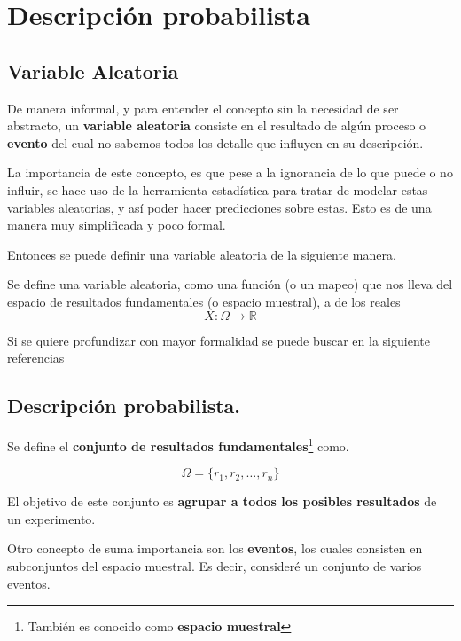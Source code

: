 \chapter{Descripción probabilista}
\label{cap:cap1}

\section{Variable Aleatoria}

De manera informal, y para entender el concepto sin la necesidad de ser abstracto, un \textbf{variable aleatoria} consiste en el resultado de algún proceso o \textbf{evento} del cual no sabemos todos los detalle que influyen en su descripción. 

La importancia de este concepto, es que pese a la ignorancia de lo que puede o no influir, se hace uso de la herramienta estadística para tratar de modelar estas variables aleatorias, y así poder hacer predicciones sobre estas. Esto es de una manera muy simplificada y poco formal.

Entonces se puede definir una variable aleatoria de la siguiente manera.
\begin{definicion}
    Se define una variable aleatoria, como una función (o un mapeo) que nos lleva del espacio de resultados fundamentales (o espacio muestral), a  de los reales 
$$X: \Omega \rightarrow \mathbb{R}$$
\end{definicion}

Si se quiere profundizar con mayor formalidad se puede buscar en la siguiente referencias \cite{RincónInterm}


\section{Descripción probabilista.}

Se define el \textbf{conjunto de resultados fundamentales}\footnote{También es conocido como \textbf{espacio muestral}} como.

\begin{equation*}
    \Omega = \{r_1,r_2,\dots,r_n\}
\end{equation*}

El objetivo de este conjunto es \textbf{agrupar a todos los posibles resultados} de un experimento.

Otro concepto de suma importancia son los \textbf{eventos}, los cuales consisten en subconjuntos del espacio muestral. Es decir, consideré un conjunto de varios eventos.

